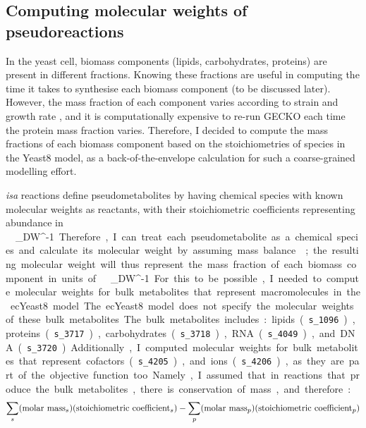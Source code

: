 \subsection{Computing molecular weights of pseudoreactions}
\label{subsec:model-yeast8-molweights}

In the yeast cell, biomass components (lipids, carbohydrates, proteins) are present in different fractions.
Knowing these fractions are useful in computing the time it takes to synthesise each biomass component (to be discussed later).
However, the mass fraction of each component varies according to strain and growth rate \parencite{nilssonMetabolicTradeoffsYeast2016, elsemmanWholecellModelingYeast2022}, and it is computationally expensive to re-run GECKO each time the protein mass fraction varies.
Therefore, I decided to compute the mass fractions of each biomass component based on the stoichiometries of species in the Yeast8 model, as a back-of-the-envelope calculation for such a coarse-grained modelling effort.

\textit{isa} reactions define pseudometabolites by having chemical species with known molecular weights as reactants, with their stoichiometric coefficients representing abundance in \SI{}{\milli\mol~\gram_{DW}^{-1}}.
Therefore, I can treat each pseudometabolite as a chemical species and calculate its molecular weight by assuming mass balance \parencite{chanStandardizingBiomassReactions2017, dinhQuantifyingPropagationParametric2022, takhaveevTemporalSegregationBiosynthetic2023};
the resulting molecular weight will thus represent the mass fraction of each biomass component in units of \SI{}{\gram~\gram_{DW}^{-1}}.

For this to be possible, I needed to compute molecular weights for bulk metabolites that represent macromolecules in the ecYeast8 model.
The ecYeast8 model does not specify the molecular weights of these bulk metabolites.
The bulk metabolites includes: lipids (\texttt{s\_1096}), proteins (\texttt{s\_3717}), carbohydrates (\texttt{s\_3718}), RNA (\texttt{s\_4049}), and DNA (\texttt{s\_3720}).
Additionally, I computed molecular weights for bulk metabolites that represent cofactors (\texttt{s\_4205}), and ions (\texttt{s\_4206}), as they are part of the objective function too.
Namely, I assumed that in reactions that produce the bulk metabolites, there is conservation of mass, and therefore:

\begin{equation}
\label{eq:conservation-of-mass}
    \sum_{s}(\text{molar mass}_{s})(\text{stoichiometric coefficient}_{s}) \\ - \sum_{p}(\text{molar mass}_{p})(\text{stoichiometric coefficient}_{p})
\end{equation}

